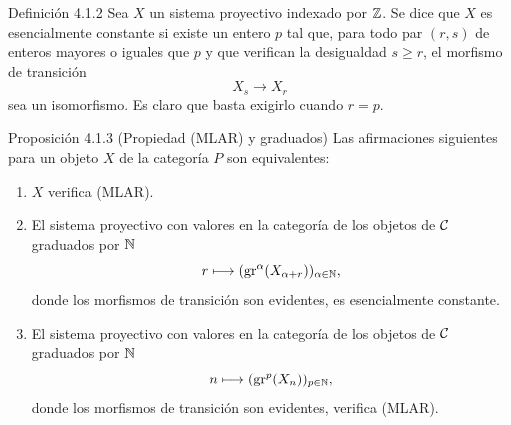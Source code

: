 \begin{statement}{Definición 4.1.2}
Sea $X$ un sistema proyectivo indexado por $\mathbb Z$. Se dice que $X$ es esencialmente constante si existe un entero $p$ tal que, para todo par $(r,s)$ de enteros mayores o iguales que $p$ y que verifican la desigualdad $s\ge r$, el morfismo de transición
\[
X_s\longrightarrow X_r
\]
sea un isomorfismo. Es claro que basta exigirlo cuando $r=p$.
\end{statement}

\begin{statement}{Proposición 4.1.3 (Propiedad (MLAR) y graduados)}
Las afirmaciones siguientes para un objeto $X$ de la categoría $P$ son equivalentes:
\begin{enumerate}[label=(\roman*)]
\item $X$ verifica (MLAR).
\item El sistema proyectivo con valores en la categoría de los objetos de $\mathcal C$ graduados por $\mathbb N$
\[
r\longmapsto (\operatorname{gr}^\alpha(X_{\alpha+r}))_{\alpha\in\mathbb N},
\]
donde los morfismos de transición son evidentes, es esencialmente constante.
\item El sistema proyectivo con valores en la categoría de los objetos de $\mathcal C$ graduados por $\mathbb N$
\[
n\longmapsto (\operatorname{gr}^p(X_n))_{p\in\mathbb N},
\]
donde los morfismos de transición son evidentes, verifica (MLAR).
\end{enumerate}
\end{statement}
